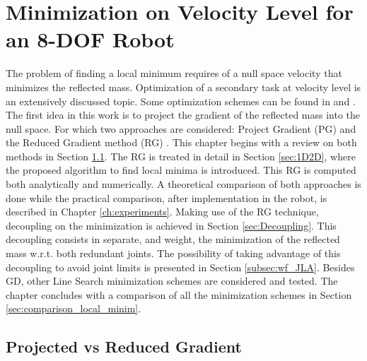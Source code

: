 \chapter{Minimization on Velocity Level for an 8-DOF Robot}
\label{ch:velocity}

The problem of finding a local minimum requires of a null space velocity that minimizes the reflected mass.
Optimization of a secondary task at velocity level is an extensively discussed topic. Some optimization schemes can be found in \cite{opt_vel_level_1} and \cite{opt_vel_level_2}.  The first idea in this work is to project the gradient of the reflected mass into the null space. For which two approaches are considered: Project Gradient (PG) \cite{JLA_1} and the Reduced Gradient method (RG) \cite{PG_RG}. This chapter begins with a review on both methods in Section \ref{sec:PGvsRG}.
 The RG is treated in detail in Section \ref{sec:1D2D}, where the proposed algorithm to find local minima is introduced. This RG is computed both analytically and numerically.  
 A theoretical comparison of both approaches is done while the practical comparison, after implementation in the robot, is described in  Chapter \ref{ch:experiments}. Making use of the RG technique, decoupling on the minimization is achieved in Section \ref{sec:Decoupling}. This decoupling consists in separate, and weight, the minimization of the reflected mass w.r.t. both redundant joints. The possibility of taking advantage of this decoupling to avoid joint limits is presented in Section \ref{subsec:wf_JLA}.
Besides GD,  other Line Search minimization schemes are considered and tested. The chapter concludes with a comparison of all the minimization schemes in  Section \ref{sec:comparison_local_minim}.
 
 


\section{Projected vs Reduced Gradient}
\label{sec:PGvsRG}

